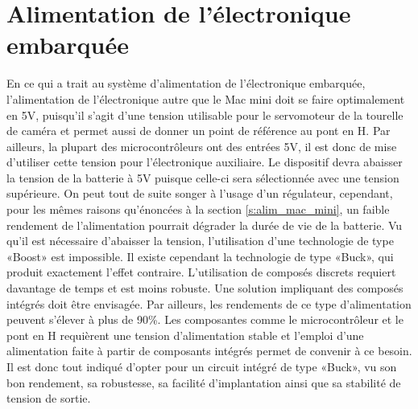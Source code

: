 \section{Alimentation de l'électronique embarquée}
En ce qui a trait au système d'alimentation de l'électronique embarquée, l'alimentation de l'électronique autre que le Mac mini doit se faire optimalement en 5V, puisqu'il s'agit d'une tension utilisable pour le servomoteur de la tourelle de caméra et permet aussi de donner un point de référence au pont en H. Par ailleurs, la plupart des microcontrôleurs ont des entrées 5V, il est donc de mise d'utiliser cette tension pour l'électronique auxiliaire. Le dispositif devra abaisser la tension de la batterie à 5V puisque celle-ci sera sélectionnée avec une tension supérieure. On peut tout de suite songer à l'usage d'un régulateur, cependant, pour les mêmes raisons qu'énoncées à la section \ref{s:alim_mac_mini}, un faible rendement de l'alimentation pourrait dégrader la durée de vie de la batterie. Vu qu'il est nécessaire d'abaisser la tension, l'utilisation d'une technologie de type «Boost» est impossible. Il existe cependant la technologie de type «Buck», qui produit exactement l'effet contraire. L'utilisation de composés discrets requiert davantage de temps et est moins robuste. Une solution impliquant des composés intégrés doit être envisagée. Par ailleurs, les rendements de ce type d'alimentation peuvent s'élever à plus de 90\%. Les composantes comme le microcontrôleur et le pont en H requièrent une tension d'alimentation stable et l'emploi d'une alimentation faite à partir de composants intégrés permet de convenir à ce besoin. Il est donc tout indiqué d'opter pour un circuit intégré de type «Buck», vu son bon rendement, sa robustesse, sa facilité d'implantation ainsi que sa stabilité de tension de sortie.